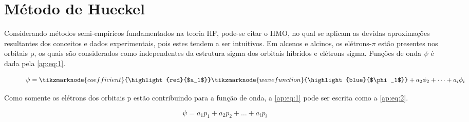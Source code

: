 \chapter{Método de Hueckel} \label{ap:HMO}

Considerando métodos semi-empíricos fundamentados na teoria \gls{HF}, pode-se citar o \gls{HMO}, no qual se aplicam as devidas aproximações resultantes dos conceitos e dados experimentais, pois estes tendem a ser intuitivos. Em alcenos e alcinos, os elétrons-$\pi$ estão presentes nos orbitais p, os quais são considerados como independentes da estrutura sigma dos orbitais híbridos e elétrons sigma. Funções de onda $\psi$ é dada pela \autoref{ap:eq:1}.

\begin{figure}[htb]
    \vspace{2\baselineskip}
\begin{equation}
    \label{ap:eq:1}
    \psi = \tikzmarknode{coefficient}{\highlight{red}{$a_1$}} \tikzmarknode{wavefunction}{\highlight{blue}{$\phi_1$}} + a_2\phi_2 + \dots + a_i \phi_i
\end{equation}
\end{figure}

Como somente os elétrons dos orbitais p estão contribuindo para a função de onda, a \autoref{ap:eq:1} pode ser escrita como a \autoref{ap:eq:2}.

\begin{figure}[htb]
    \vspace{2\baselineskip}
\begin{equation}
    \label{ap:eq:2}
    \psi = a_1 p_1 + a_2 p_2 + \dots + a_i p_i
\end{equation}
\end{figure}

